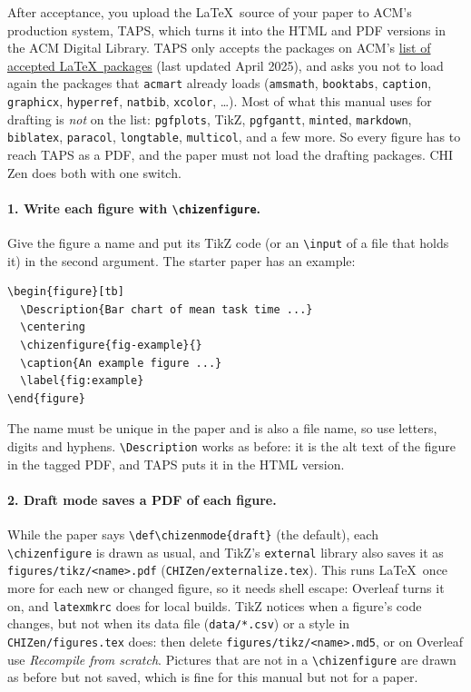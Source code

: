 After acceptance, you upload the \LaTeX\ source of your paper to ACM's production system, TAPS, which turns it into the HTML and PDF versions in the ACM Digital Library. TAPS only accepts the packages on ACM's \href{https://authors.acm.org/proceedings/production-information/accepted-latex-packages}{list of accepted \LaTeX\ packages} (last updated April 2025), and asks you not to load again the packages that \texttt{acmart} already loads (\texttt{amsmath}, \texttt{booktabs}, \texttt{caption}, \texttt{graphicx}, \texttt{hyperref}, \texttt{natbib}, \texttt{xcolor}, \dots). Most of what this manual uses for drafting is \emph{not} on the list: \texttt{pgfplots}, TikZ, \texttt{pgfgantt}, \texttt{minted}, \texttt{markdown}, \texttt{biblatex}, \texttt{paracol}, \texttt{longtable}, \texttt{multicol}, and a few more. So every figure has to reach TAPS as a PDF, and the paper must not load the drafting packages. CHI Zen does both with one switch.

\paragraph{1. Write each figure with \texttt{\textbackslash chizenfigure}.} Give the figure a name and put its TikZ code (or an \texttt{\textbackslash input} of a file that holds it) in the second argument. The starter paper has an example:
\begin{verbatim}
\begin{figure}[tb]
  \Description{Bar chart of mean task time ...}
  \centering
  \chizenfigure{fig-example}{}
  \caption{An example figure ...}
  \label{fig:example}
\end{figure}
\end{verbatim}
The name must be unique in the paper and is also a file name, so use letters, digits and hyphens. \texttt{\textbackslash Description} works as before: it is the alt text of the figure in the tagged PDF, and TAPS puts it in the HTML version.

\paragraph{2. Draft mode saves a PDF of each figure.} While the paper says \texttt{\textbackslash def\textbackslash chizenmode\{draft\}} (the default), each \texttt{\textbackslash chizenfigure} is drawn as usual, and TikZ's \texttt{external} library also saves it as \texttt{figures/\allowbreak tikz/\allowbreak <name>.pdf} (\texttt{CHIZen/\allowbreak externalize.tex}). This runs \LaTeX\ once more for each new or changed figure, so it needs shell escape: Overleaf turns it on, and \texttt{latexmkrc} does for local builds. TikZ notices when a figure's code changes, but not when its data file (\texttt{data/*.csv}) or a style in \texttt{CHIZen/figures.tex} does: then delete \texttt{figures/tikz/<name>.md5}, or on Overleaf use \emph{Recompile from scratch}. Pictures that are not in a \texttt{\textbackslash chizenfigure} are drawn as before but not saved, which is fine for this manual but not for a paper.


